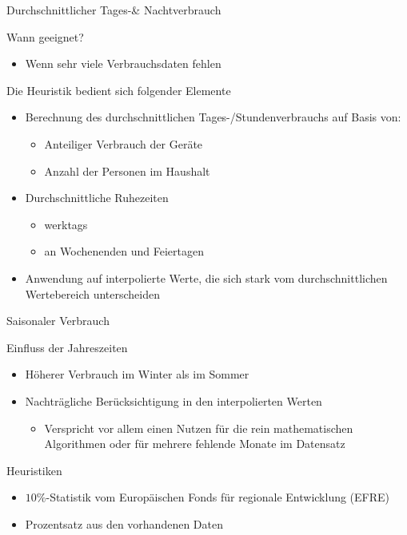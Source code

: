 \begin{frame}{Durchschnittlicher Tages-\& Nachtverbrauch}
\begin{block}{Wann geeignet?}
\begin{itemize}
\item Wenn sehr viele Verbrauchsdaten fehlen
\end{itemize}
\end{block}
\begin{block}{Die Heuristik bedient sich folgender Elemente}
\begin{itemize}
\item Berechnung des durchschnittlichen Tages-/Stundenverbrauchs auf Basis von:
\begin{itemize}
\item Anteiliger Verbrauch der Geräte
\item Anzahl der Personen im Haushalt
\end{itemize}
\item Durchschnittliche Ruhezeiten
\begin{itemize}
\item werktags
\item an Wochenenden und Feiertagen
\end{itemize}
\item Anwendung auf interpolierte Werte, die sich stark vom durchschnittlichen Wertebereich unterscheiden
\end{itemize}
\end{block}
\end{frame}

\begin{frame}{Saisonaler Verbrauch}
\begin{block}{Einfluss der Jahreszeiten}
\begin{itemize}
\item Höherer Verbrauch im Winter als im Sommer
\item Nachträgliche Berücksichtigung in den interpolierten Werten
\begin{itemize}
\item Verspricht vor allem einen Nutzen für die rein mathematischen Algorithmen oder für mehrere fehlende Monate im Datensatz
\end{itemize}
\end{itemize}
\end{block}
\begin{block}{Heuristiken}
\begin{itemize}
\item $10\%$-Statistik vom Europäischen Fonds für regionale Entwicklung (EFRE)
\item Prozentsatz aus den vorhandenen Daten
\end{itemize}
\end{block}
\end{frame}

